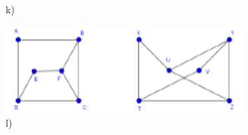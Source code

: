 \documentclass[12pt,en,a4paper]{article}
\begin{document}
\begin{figure}[ht]
\begin{minipage}{0.5\textwidth}
			\caption*{k)}
			\label{fig:gprob4_11}
		\end{minipage}
		\begin{minipage}{0.5\textwidth}
			\includegraphics[width=0.8\textwidth]{gprob4_12.png}
			\caption*{l)}
			\label{fig:gprob4_12}
		\end{minipage}
	\end{figure}
\end{document}
